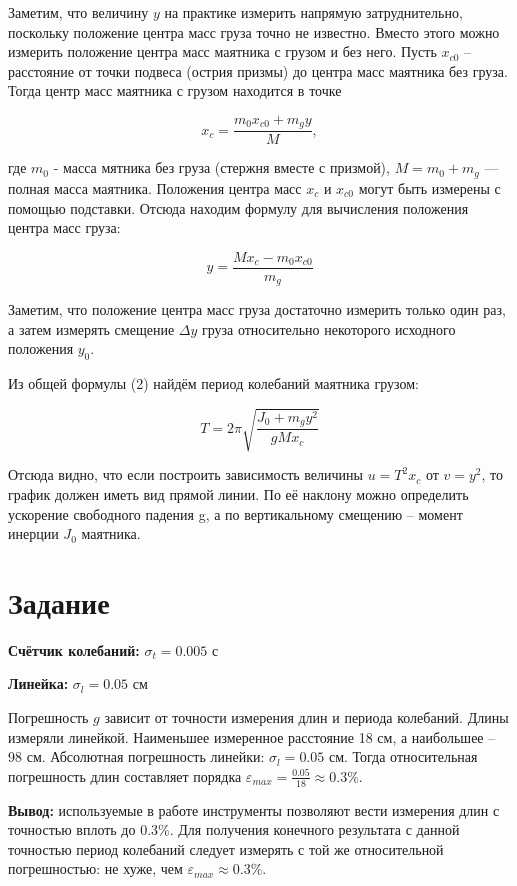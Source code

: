 \documentclass[12pt, a4paper]{article}
\begin{document}
Заметим, что величину $y$ на практике измерить напрямую затруднительно,
поскольку положение центра масс груза точно не известно. Вместо этого можно
измерить положение центра масс маятника с грузом и без него.
Пусть $x_{c0}$ -- расстояние от точки подвеса (острия
призмы) до центра масс маятника без груза. Тогда центр
масс маятника с грузом находится в точке

\[x_c = \frac{m_0x_{c0} + m_gy}{M},\]

где $m_0$ - масса мятника без груза (стержня вместе с призмой),
$M = m_0 + m_g$ — полная масса маятника. Положения центра масс
$x_c$ и $x_{c0}$ могут быть измерены с помощью подставки. Отсюда находим
формулу для вычисления положения центра масс груза:

\begin{equation}
    y = \frac{Mx_c - m_0x_{c0}}{m_g}
\end{equation}

Заметим, что положение центра масс груза достаточно измерить
\newline
только один раз, а затем измерять смещение $\Delta{y}$ груза относительно
некоторого исходного положения $y_0$.

Из общей формулы (2) найдём период колебаний маятника грузом:

\begin{equation}
    T = 2\pi\sqrt{\frac{J_0 + m_gy^2}{gMx_c}}
\end{equation}

Отсюда видно, что если построить зависимость величины $u = T^2x_c$ от
$v = y^2$, то график должен иметь вид прямой линии. По её наклону можно
определить ускорение свободного падения g, а по вертикальному смещению --
момент инерции $J_0$ маятника.

\section{Задание}

\textbf{Счётчик колебаний:} $\sigma_t = 0.005$ с

\textbf{Линейка:} $\sigma_l = 0.05$ см

Погрешность $g$ зависит от точности измерения длин и периода колебаний. Длины
измеряли линейкой. Наименьшее измеренное расстояние 18 см, а наибольшее --
98 см. Абсолютная погрешность линейки: $\sigma_l = 0.05$ см.
Тогда относительная погрешность длин составляет порядка
$\varepsilon_{max} = \frac{0.05}{18} \approx 0.3\%$.

\textbf{Вывод:} используемые в работе инструменты позволяют вести измерения
длин с точностью вплоть до 0.3\%. Для получения конечного результата с данной
точностью период колебаний следует измерять с той же относительной
погрешностью: не хуже, чем $\varepsilon_{max} \approx 0.3\%$.
\end{document}
